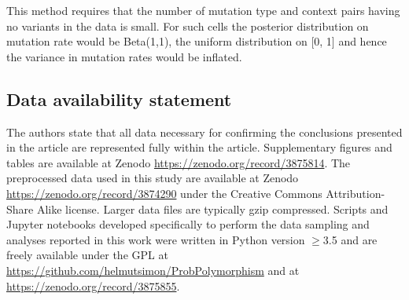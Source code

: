 This method requires that the number of mutation type and context pairs having no variants in the data is small. For such cells the posterior distribution on mutation rate would be Beta(1,1), the uniform distribution on [0, 1] and hence the variance in mutation rates would be inflated.

\subsection*{Data availability statement}
The authors state that all data necessary for confirming the conclusions presented in the article are represented fully
within the article. Supplementary figures and tables are available at Zenodo \url{https://zenodo.org/record/3875814}.
The preprocessed data used in this study are available at Zenodo \url{https://zenodo.org/record/3874290} under the
Creative Commons Attribution-Share Alike license. Larger data files are typically gzip compressed. Scripts and Jupyter notebooks developed specifically to perform the data sampling and analyses reported in this work were written in Python version $\ge$3.5 and are freely available under the GPL at \url{https://github.com/helmutsimon/ProbPolymorphism} and at \url{https://zenodo.org/record/3875855}.